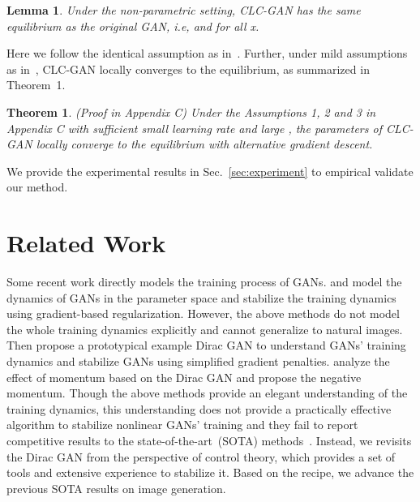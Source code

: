 \documentclass{article}
\newcommand{\secref}[1]{Sec.~\ref{sec:#1}} \usepackage{wrapfig}
\newtheorem{lemma}{Lemma}
\newtheorem{theorem}{Theorem}
\theoremstyle{definition}
\begin{document}
\begin{lemma}
Under the non-parametric setting, CLC-GAN has the same equilibrium as the original GAN, i.e,  and  for all x.
\end{lemma}

Here we follow the identical assumption as in~\citet{goodfellow2014generative}.
Further, under mild assumptions as in~\citet{mescheder2018training}, CLC-GAN locally converges to the equilibrium, as summarized in Theorem~1.


\begin{theorem}(Proof in Appendix C)
Under the Assumptions 1, 2 and 3 in Appendix C with sufficient small learning rate and large , the parameters of CLC-GAN locally converge to the equilibrium with alternative gradient descent.
\end{theorem}

We provide the experimental results in \secref{experiment} to empirical validate our method.







\section{Related Work}\label{sec:related_work}




Some recent work directly models the training process of GANs.
\citet{mescheder2017numerics} and \citet{nagarajan2017gradient} model the dynamics of GANs in the parameter space and stabilize the training dynamics using gradient-based regularization. However, the above methods do not model the whole training dynamics explicitly and cannot generalize to natural images.
Then \citet{mescheder2018training} propose a prototypical example Dirac GAN to understand GANs' training dynamics and stabilize GANs using simplified gradient penalties. 
\citet{gidel2018negative} analyze the effect of momentum based on the Dirac GAN and propose the negative momentum.
Though the above methods provide an elegant understanding of the training dynamics, this understanding does not provide a practically effective algorithm to stabilize nonlinear GANs' training and they fail to report competitive results to the state-of-the-art~(SOTA) methods~\cite{miyato2018spectral}. 
Instead, we revisits the Dirac GAN from the perspective of control theory, which provides a set of tools and extensive experience to stabilize it.
Based on the recipe, we advance the previous SOTA results on image generation.
\end{document}
